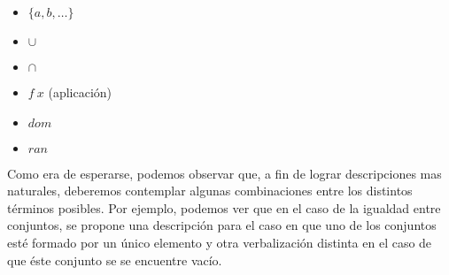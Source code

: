 \begin{itemize} [label={$\triangleright$}, leftmargin=*]
\begin{enumerate}
	\setlength{\itemsep}{7pt}
	\end{enumerate}
\item{$\{a, b, \ldots\}$}
	\begin{enumerate}	 
	\setlength{\itemsep}{7pt}
	\end{enumerate}
\item{$\cup$}
	\begin{enumerate}	 
	\setlength{\itemsep}{7pt}
	\end{enumerate}
\item{$\cap$}
	\begin{enumerate}	 
	\setlength{\itemsep}{7pt}
	\end{enumerate}
\item{$f~x$ (aplicación)}
	\begin{enumerate}	 
	\setlength{\itemsep}{7pt}
	\end{enumerate}
\item{$dom$}
	\begin{enumerate}	 
	\setlength{\itemsep}{7pt}
	\end{enumerate}
\item{$ran$}
	\begin{enumerate}	 
	\setlength{\itemsep}{7pt}
	\end{enumerate}
\end{itemize}  

\bigskip
Como era de esperarse, podemos observar que, a fin de lograr descripciones mas naturales, deberemos contemplar algunas combinaciones entre los distintos términos posibles. Por ejemplo, podemos ver que en el caso de la igualdad entre conjuntos, se propone una descripción para el caso en que uno de los conjuntos esté formado por un único elemento y otra verbalización distinta en el caso de que éste conjunto se se encuentre vacío.


